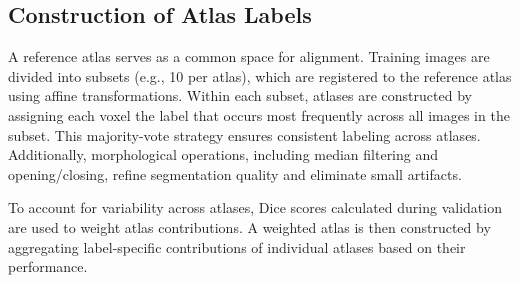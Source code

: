 \subsection{Construction of Atlas Labels}
A reference atlas serves as a common space for alignment. Training images are divided into subsets (e.g., 10 per atlas), which are registered to the reference atlas using affine transformations. Within each subset, atlases are constructed by assigning each voxel the label that occurs most frequently across all images in the subset. This majority-vote strategy ensures consistent labeling across atlases. Additionally, morphological operations, including median filtering and opening/closing, refine segmentation quality and eliminate small artifacts.

To account for variability across atlases, Dice scores calculated during validation are used to weight atlas contributions. A weighted atlas is then constructed by aggregating label-specific contributions of individual atlases based on their performance.




